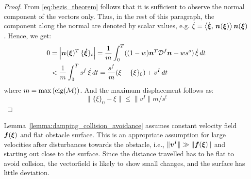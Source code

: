 \begin{proof}
From \eqref{eq:bezis_theorem} follows that it is sufficient to observe the normal component of the vectors only. Thus, in the rest of this paragraph, the component along the normal are denoted by scalar values, e.g. $\dot \xi = \left\langle {\dot{\boldsymbol{\xi}}}, \, {\boldsymbol{n}(\boldsymbol{\xi})} \right\rangle \boldsymbol{n}(\boldsymbol{\xi})$.
Hence, we get:
\begin{align}
	0 & = \left| \boldsymbol{n}(\boldsymbol{\xi})^T \, \{ \boldsymbol{\dot \xi} \}_{t} \right| 
	  = \frac 1 m \int_0^T ( (1-w) \boldsymbol{n}^T \mathcal{D}^f \boldsymbol{n} + w s^{o} ) \, {\dot \xi} \, dt \nonumber \\
	   & < \frac 1 m \int_0^T  s^{f}  \, {\dot \xi} \, dt 
	   = \frac{s^f}{m} (\xi - \{ \xi \}_0 ) + v^I \, dt 
\end{align}
where $m = \max{\left(\text{eig}(\mathcal{M})\right)}$. 
And the maximum displacement follows as:
\begin{equation}
	\| \{\xi \}_0 - {\xi} \| \leq \| v^I \| {m} / {s^{\mathrm{f}}} 
\end{equation}
\end{proof}

Lemma~\ref{lemma:damping_collision_avoidance} assumes constant velocity field $\boldsymbol{f}(\boldsymbol{\xi})$ and flat obstacle surface. This is an appropriate assumption for large velocities after disturbances towards the obstacle, i.e., $\| \boldsymbol{v}^I \| \gg \| \boldsymbol{f}(\boldsymbol{\xi}) \|$ and starting out close to the surface. Since the distance travelled has to be flat to avoid collsion, the vectorfield is likely to show small changes, and the surface has little deviation. 

